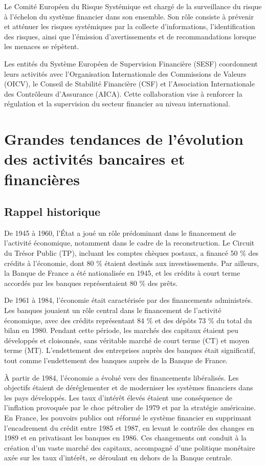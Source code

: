 \documentclass[a4paper, 12pt]{report}
\begin{document}
Le Comité Européen du Risque Systémique est chargé de la surveillance du risque à l'échelon du système financier dans son ensemble. Son rôle consiste à prévenir et atténuer les risques systémiques par la collecte d'informations, l'identification des risques, ainsi que l'émission d'avertissements et de recommandations lorsque les menaces se répètent.

Les entités du Système Européen de Supervision Financière (SESF) coordonnent leurs activités avec l'Organisation Internationale des Commissions de Valeurs (OICV), le Conseil de Stabilité Financière (CSF) et l'Association Internationale des Contrôleurs d'Assurance (AICA). Cette collaboration vise à renforcer la régulation et la supervision du secteur financier au niveau international.

\section{Grandes tendances de l’évolution des activités bancaires et financières}

\subsection{Rappel historique}

De 1945 à 1960, l'État a joué un rôle prédominant dans le financement de l'activité économique, notamment dans le cadre de la reconstruction. Le Circuit du Trésor Public (TP), incluant les comptes chèques postaux, a financé 50 \% des crédits à l'économie, dont 80 \% étaient destinés aux investissements. Par ailleurs, la Banque de France a été nationalisée en 1945, et les crédits à court terme accordés par les banques représentaient 80 \% des prêts.

De 1961 à 1984, l'économie était caractérisée par des financements administrés. Les banques jouaient un rôle central dans le financement de l'activité économique, avec des crédits représentant 84 \% et des dépôts 73 \% du total du bilan en 1980. Pendant cette période, les marchés des capitaux étaient peu développés et cloisonnés, sans véritable marché de court terme (CT) et moyen terme (MT). L'endettement des entreprises auprès des banques était significatif, tout comme l'endettement des banques auprès de la Banque de France.

À partir de 1984, l'économie a évolué vers des financements libéralisés. Les objectifs étaient de déréglementer et de moderniser les systèmes financiers dans les pays développés. Les taux d'intérêt élevés étaient une conséquence de l'inflation provoquée par le choc pétrolier de 1979 et par la stratégie américaine. En France, les pouvoirs publics ont réformé le système financier en supprimant l'encadrement du crédit entre 1985 et 1987, en levant le contrôle des changes en 1989 et en privatisant les banques en 1986. Ces changements ont conduit à la création d'un vaste marché des capitaux, accompagné d'une politique monétaire axée sur les taux d'intérêt, se déroulant en dehors de la Banque centrale.
\end{document}
